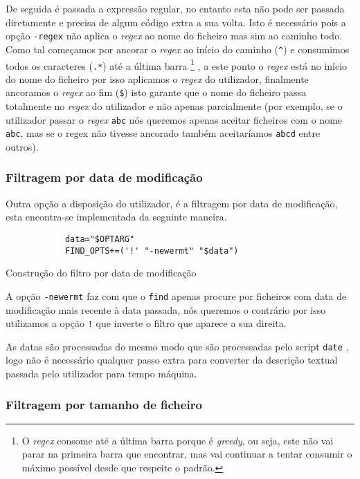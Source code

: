De seguida é passada a expressão regular, no entanto esta não pode ser passada
diretamente e precisa de algum código extra a sua volta. Isto é necessário pois
a opção \Verb|-regex| não aplica o \emph{regex} ao nome do ficheiro mas sim ao
caminho todo. Como tal começamos por ancorar o \emph{regex} ao início do caminho
(\Verb|^|) e consumimos todos os caracteres (\Verb|.*|) até a última barra
\footnote{O \emph{regex} consome até a última barra porque é \emph{greedy}, ou
	seja, este não vai parar na primeira barra que encontrar, mas vai continuar a
	tentar consumir o máximo possível desde que respeite o padrão.}
, a este ponto o \emph{regex} está no início do nome do ficheiro por isso
aplicamos o \emph{regex} do utilizador, finalmente ancoramos o \emph{regex} ao
fim (\Verb|$|) isto garante que o nome do ficheiro passa totalmente no
\emph{regex} do utilizador e não apenas parcialmente (por exemplo, se o
utilizador passar o \emph{regex} \Verb|abc| nós queremos apenas aceitar
ficheiros com o nome \Verb|abc|, mas se o regex não tivesse ancorado também
aceitaríamos \Verb|abcd| entre outros).

\subsubsection{Filtragem por data de modificação}

Outra opção a disposição do utilizador, é a filtragem por data de modificação,
esta encontra-se implementada da seguinte maneira.

\begin{listing}[H]
	\centering
	\begin{verbatim}
			data="$OPTARG"
			FIND_OPTS+=('!' "-newermt" "$data")
  \end{verbatim}
	\caption{Construção do filtro por data de modificação}
\end{listing}

A opção \Verb|-newermt| faz com que o \Verb|find| apenas procure por ficheiros
com data de modificação mais recente à data passada, nós queremos o contrário por
isso utilizamos a opção \Verb|!| que inverte o filtro que aparece a sua direita.

As datas são processadas do mesmo modo que são processadas pelo script
\Verb|date| \cite{find_man}, logo não é necessário qualquer passo extra para
converter da descrição textual passada pelo utilizador para tempo máquina.

\subsubsection{Filtragem por tamanho de ficheiro}

